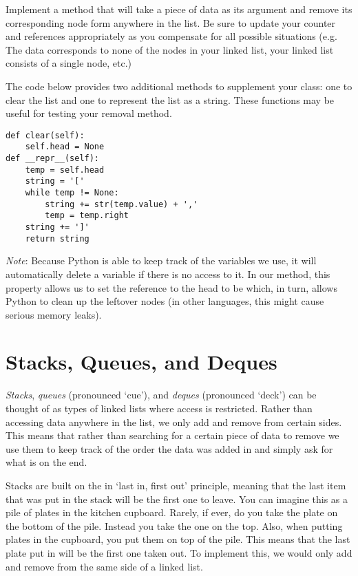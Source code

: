 \begin{problem}
Implement a  method that will take a piece of data as its argument and remove its corresponding node form anywhere in the list.
Be sure to update your counter and references appropriately as you compensate for all possible situations (e.g. The data corresponds to none of the nodes in your linked list, your linked list consists of a single node, etc.)

The code below provides two additional methods to supplement your  class: one to clear the list and one to represent the list as a string.
These functions may be useful for testing your removal method.
\begin{lstlisting}
def clear(self):
    self.head = None
def __repr__(self):
    temp = self.head
    string = '['
    while temp != None:
        string += str(temp.value) + ','
        temp = temp.right
    string += ']'
    return string
\end{lstlisting}
\label{prob:LinkedLists}
\emph{Note}: Because Python is able to keep track of the variables we use, it will automatically delete a variable if there is no access to it.
In our  method, this property allows us to set the reference to the head to be  which, in turn, allows Python to clean up the leftover nodes (in other languages, this might cause serious memory leaks).

\end{problem}

\section*{Stacks, Queues, and Deques}
\emph{Stacks}, \emph{queues} (pronounced `cue'), and \emph{deques} (pronounced `deck') can be thought of as types of linked lists where access is restricted.
Rather than accessing data anywhere in the list, we only add and remove from certain sides.
This means that rather than searching for a certain piece of data to remove we use them to keep track of the order the data was added in and simply ask for what is on the end.

Stacks are built on the in `last in, first out' principle, meaning that the last item that was put in the stack will be the first one to leave.
You can imagine this as a pile of plates in the kitchen cupboard. Rarely, if ever, do you take the plate on the bottom of the pile.
Instead you take the one on the top. Also, when putting plates in the cupboard, you put them on top of the pile.
This means that the last plate put in will be the first one taken out.
To implement this, we would only add and remove from the same side of a linked list.

